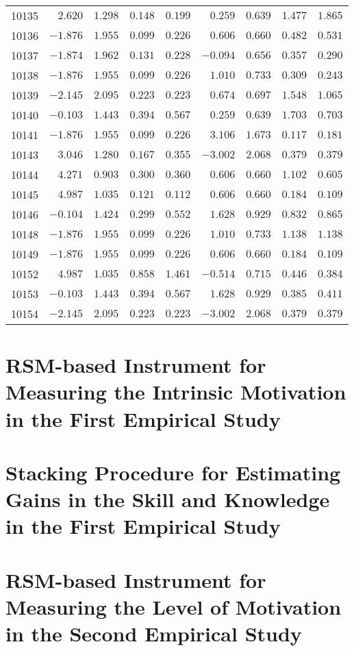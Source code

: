 \begin{landscape}
{\begin{longtable}{lrrrrrrrr}
10135&$ 2.620$&$1.298$&$0.148$&$0.199$&$ 0.259$&$0.639$&$1.477$&$1.865$\tabularnewline
10136&$-1.876$&$1.955$&$0.099$&$0.226$&$ 0.606$&$0.660$&$0.482$&$0.531$\tabularnewline
10137&$-1.874$&$1.962$&$0.131$&$0.228$&$-0.094$&$0.656$&$0.357$&$0.290$\tabularnewline
10138&$-1.876$&$1.955$&$0.099$&$0.226$&$ 1.010$&$0.733$&$0.309$&$0.243$\tabularnewline
10139&$-2.145$&$2.095$&$0.223$&$0.223$&$ 0.674$&$0.697$&$1.548$&$1.065$\tabularnewline
10140&$-0.103$&$1.443$&$0.394$&$0.567$&$ 0.259$&$0.639$&$1.703$&$0.703$\tabularnewline
10141&$-1.876$&$1.955$&$0.099$&$0.226$&$ 3.106$&$1.673$&$0.117$&$0.181$\tabularnewline
10143&$ 3.046$&$1.280$&$0.167$&$0.355$&$-3.002$&$2.068$&$0.379$&$0.379$\tabularnewline
10144&$ 4.271$&$0.903$&$0.300$&$0.360$&$ 0.606$&$0.660$&$1.102$&$0.605$\tabularnewline
10145&$ 4.987$&$1.035$&$0.121$&$0.112$&$ 0.606$&$0.660$&$0.184$&$0.109$\tabularnewline
10146&$-0.104$&$1.424$&$0.299$&$0.552$&$ 1.628$&$0.929$&$0.832$&$0.865$\tabularnewline
10148&$-1.876$&$1.955$&$0.099$&$0.226$&$ 1.010$&$0.733$&$1.138$&$1.138$\tabularnewline
10149&$-1.876$&$1.955$&$0.099$&$0.226$&$ 0.606$&$0.660$&$0.184$&$0.109$\tabularnewline
10152&$ 4.987$&$1.035$&$0.858$&$1.461$&$-0.514$&$0.715$&$0.446$&$0.384$\tabularnewline
10153&$-0.103$&$1.443$&$0.394$&$0.567$&$ 1.628$&$0.929$&$0.385$&$0.411$\tabularnewline
10154&$-2.145$&$2.095$&$0.223$&$0.223$&$-3.002$&$2.068$&$0.379$&$0.379$\tabularnewline
\hline
\end{longtable}}\end{landscape}


\section{RSM-based Instrument for Measuring the Intrinsic Motivation in the First Empirical Study}
\label{sec:irt-motivation-first-study}




\newpage
\section{Stacking Procedure for Estimating Gains in the Skill and Knowledge in the First Empirical Study}
\label{sec:irt-learning-outcomes-first-study}

\section{RSM-based Instrument for Measuring the Level of Motivation in the Second Empirical Study}
\label{sec:irt-motivation-second-study}

